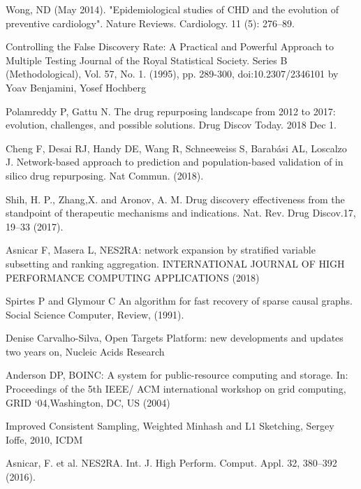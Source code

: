 \documentclass[fleqn,10pt]{SelfArx} %
\begin{document}
%
%
\begin{thebibliography}{1}
	
	 Wong, ND (May 2014). "Epidemiological studies of CHD and the evolution of preventive cardiology". Nature Reviews. Cardiology. 11 (5): 276–89.
	
	 Controlling the False Discovery Rate: A Practical and Powerful Approach to Multiple Testing Journal of the Royal Statistical Society. Series B (Methodological), Vol. 57, No. 1. (1995), pp. 289-300, doi:10.2307/2346101 by Yoav Benjamini, Yosef Hochberg
	
	 Polamreddy P, Gattu N. The drug repurposing landscape from 2012 to 2017: evolution, challenges, and possible solutions. Drug Discov Today. 2018 Dec 1.	
	
	 Cheng F, Desai RJ, Handy DE, Wang R, Schneeweiss S, Barabási AL, Loscalzo J. Network-based approach to prediction and population-based validation of in silico drug repurposing. Nat Commun. (2018).
	
	 Shih, H. P., Zhang,X. and Aronov, A. M. Drug discovery effectiveness from the standpoint of therapeutic mechanisms and indications. Nat. Rev. Drug Discov.17, 19–33 (2017).

	 Asnicar F, Masera L, NES2RA: network expansion by stratified variable subsetting and ranking aggregation. INTERNATIONAL JOURNAL OF HIGH PERFORMANCE COMPUTING APPLICATIONS (2018)
	
	Spirtes P and Glymour C An algorithm for fast recovery of sparse causal graphs. Social Science Computer, Review, (1991).  

	Denise Carvalho-Silva, Open Targets Platform: new developments and updates two years on, Nucleic Acids Research 
	
	Anderson DP, BOINC: A system for public-resource computing and storage. In: Proceedings of the 5th IEEE/ ACM international workshop on grid computing, GRID ‘04,Washington, DC, US (2004)
	
	Improved Consistent Sampling, Weighted Minhash and L1 Sketching, Sergey Ioffe, 2010, ICDM
	
	 Asnicar, F. et al. NES2RA. Int. J. High Perform. Comput. Appl. 32, 380–392 (2016).
	

\end{thebibliography}
\end{document}
